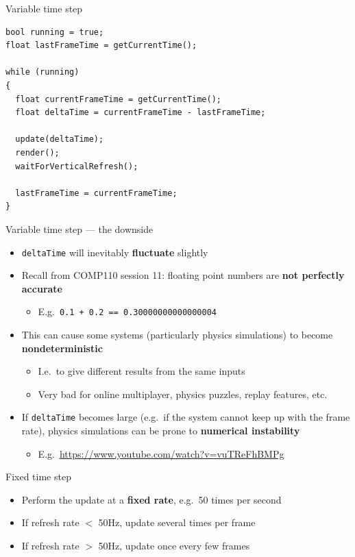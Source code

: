 \begin{frame}[fragile]{Variable time step}
    \begin{lstlisting}
bool running = true;
float lastFrameTime = getCurrentTime();

while (running)
{
  float currentFrameTime = getCurrentTime();
  float deltaTime = currentFrameTime - lastFrameTime;

  update(deltaTime);
  render();
  waitForVerticalRefresh();
    
  lastFrameTime = currentFrameTime;
}
    \end{lstlisting}
\end{frame}

\begin{frame}{Variable time step --- the downside}
    \begin{itemize}
    	\pause\item \lstinline{deltaTime} will inevitably \textbf{fluctuate} slightly
    	\pause\item Recall from COMP110 session 11: floating point numbers are \textbf{not perfectly accurate}
    		\begin{itemize}
    			\pause\item E.g.\ \lstinline{0.1 + 0.2 == 0.30000000000000004}
			\end{itemize}
    	\pause\item This can cause some systems (particularly physics simulations) to become
    		\textbf{nondeterministic}
    		\begin{itemize}
    			\pause\item I.e.\ to give different results from the same inputs
    			\pause\item Very bad for online multiplayer, physics puzzles, replay features, etc.
			\end{itemize}
    	\pause\item If \lstinline{deltaTime} becomes large (e.g.\ if the system cannot keep up with the frame rate),
    		physics simulations can be prone to \textbf{numerical instability}
    		\begin{itemize}
    			\pause\item E.g.\ \url{https://www.youtube.com/watch?v=vuTReFhBMPg}
    		\end{itemize}
    \end{itemize}
\end{frame}

\begin{frame}{Fixed time step}
    \begin{itemize}
        \pause\item Perform the update at a \textbf{fixed rate}, e.g.\ 50 times per second 
        \pause\item If refresh rate $<$ 50Hz, update several times per frame 
        \pause\item If refresh rate $>$ 50Hz, update once every few frames
    \end{itemize}
\end{frame}

